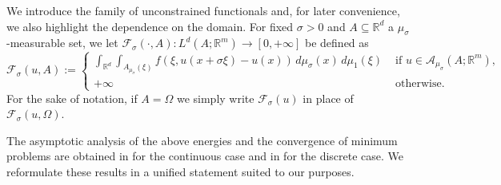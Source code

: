 \documentclass{article}
\theoremstyle{plain}
\theoremstyle{definition}
\def\rr{{\mathbb R}}
\def\ms{\mu_\sigma}
\newcommand{\s}{\sigma}
\newcommand{\A}{\mathcal{A}}
\numberwithin{equation}{section}
\begin{document}
We introduce the family of unconstrained functionals and, for later convenience, we also highlight the dependence on the domain. For fixed $\s>0$ and $A\subseteq\rr^d$ a $\ms$-measurable set, we let $\mathcal{F}_\s(\cdot, A):L^d(A;\mathbb{R}^{m})\rightarrow [0,+\infty]$ be defined as
\begin{equation} \label{funzionali unconstrained}
\mathcal{F}_\s(u,A):=\begin{cases}
\displaystyle\int_{\mathbb{R}^{d}}\int_{A_{\ms}(\xi)}f(\xi, u(x+\s\xi)-u(x))\, d\ms(x)\, d\mu_1(\xi) & \text{ if } u\in\A_{\ms}(A;\rr^m),\\[3pt]
+\infty & \text{ otherwise}.
\end{cases}
\end{equation}
For the sake of notation, if $A=\Omega$ we simply write $\mathcal{F}_\s(u)$ in place of $\mathcal{F}_\s(u,\Omega)$. 

The asymptotic analysis of the above energies and the convergence of minimum problems are obtained in \cite[Theorem 6.1, Proposition 6.4]{AABPT} for the continuous case and in \cite[Theorem 4.1, Corollary 4.6]{AliCic} for the discrete case. We reformulate these results in a unified statement suited to our purposes.
\end{document}
